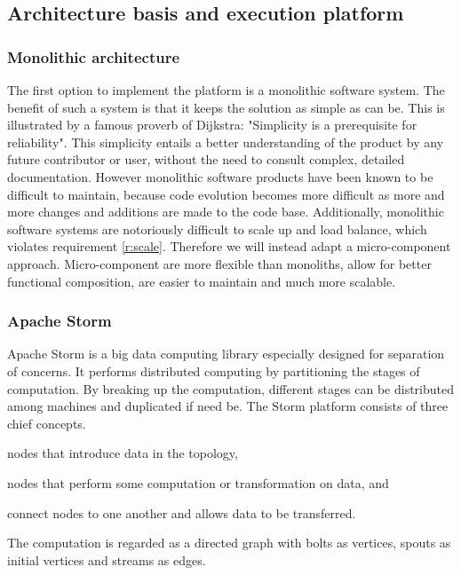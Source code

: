 \subsection{Architecture basis and execution platform}
\subsubsection*{Monolithic architecture}
The first option to implement the platform is a monolithic software system. The benefit of such a system is that it keeps the solution as simple as can be. This is illustrated by a famous proverb of Dijkstra: "Simplicity is a prerequisite for reliability"\cite{zoeken}. This simplicity entails a better understanding of the product by any future contributor or user, without the need to consult complex, detailed documentation. However monolithic software products have been known to be difficult to maintain, because code evolution becomes more difficult as more and more changes and additions are made to the code base\cite{TODO:find}. Additionally, monolithic software systems are notoriously difficult to scale up and load balance\cite{TODO:find}, which violates requirement \ref{r:scale}. Therefore we will instead adapt a micro-component approach. Micro-component are  more flexible than monoliths, allow for better functional composition, are easier to maintain and much more scalable\cite{TODO:find}.

\subsubsection*{Apache Storm}
Apache Storm is a big data computing library especially designed for separation of concerns. It performs distributed computing by partitioning the stages of computation. By breaking up the computation, different stages can be distributed among machines and duplicated if need be. The Storm platform consists of three chief concepts.
\begin{description}
\nospace
\item[Spouts:] nodes that introduce data in the topology,
\item[Bolts:] nodes that perform some computation or transformation on data, and
\item[Streams:] connect nodes to one another and allows data to be transferred.
\end{description}
The computation is regarded as a directed graph with bolts as vertices, spouts as initial vertices and streams as edges.

